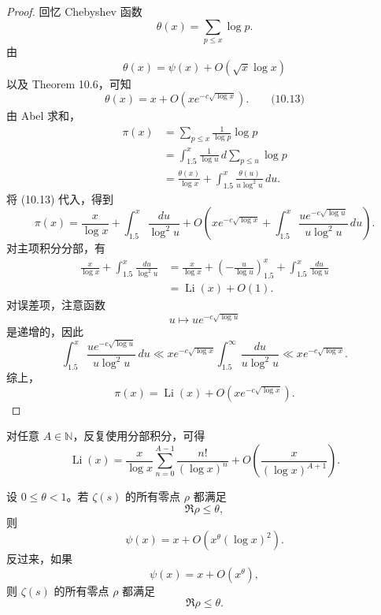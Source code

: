 \begin{proof}
	回忆 Chebyshev 函数
	\[
		\theta(x)=\sum_{p\leq x}\log p.
	\]
	由
	\[
		\theta(x)=\psi(x)+O(\sqrt{x}\log x)
	\]
	以及 Theorem 10.6，可知
	\begin{equation*}
		\theta(x)
		=
		x+O\left(xe^{-c\sqrt{\log x}}\right).
		\qquad\text{(10.13)}
	\end{equation*}
	由 Abel 求和，
	\[
	\begin{aligned}
		\pi(x)
		&=
		\sum_{p\leq x}\frac1{\log p}\log p \\
		&=
		\int_{1.5}^{x}\frac1{\log u}\,d\sum_{p\leq u}\log p \\
		&=
		\frac{\theta(x)}{\log x}
		+
		\int_{1.5}^{x}\frac{\theta(u)}{u\log^2u}\,du.
	\end{aligned}
	\]
	将 (10.13) 代入，得到
	\[
		\pi(x)
		=
		\frac{x}{\log x}
		+
		\int_{1.5}^{x}\frac{du}{\log^2u}
		+
		O\left(
			xe^{-c\sqrt{\log x}}
			+
			\int_{1.5}^{x}\frac{u e^{-c\sqrt{\log u}}}{u\log^2u}\,du
		\right).
	\]
	对主项积分分部，有
	\[
	\begin{aligned}
		\frac{x}{\log x}
		+
		\int_{1.5}^{x}\frac{du}{\log^2u}
		&=
		\frac{x}{\log x}
		+
		\left(-\frac{u}{\log u}\right)_{1.5}^{x}
		+
		\int_{1.5}^{x}\frac{du}{\log u} \\
		&=
		\operatorname{Li}(x)+O(1).
	\end{aligned}
	\]
	对误差项，注意函数
	\[
		u\longmapsto u e^{-c\sqrt{\log u}}
	\]
	是递增的，因此
	\[
		\int_{1.5}^{x}
		\frac{u e^{-c\sqrt{\log u}}}{u\log^2u}\,du
		\ll
		xe^{-c\sqrt{\log x}}
		\int_{1.5}^{\infty}\frac{du}{u\log^2u}
		\ll
		xe^{-c\sqrt{\log x}}.
	\]
	综上，
	\[
		\pi(x)
		=
		\operatorname{Li}(x)
		+
		O\left(xe^{-c\sqrt{\log x}}\right).
	\]
\end{proof}

\begin{remark}[原文 Remark]
	对任意 $A\in\mathbb N$，反复使用分部积分，可得
	\[
		\operatorname{Li}(x)
		=
		\frac{x}{\log x}
		\sum_{n=0}^{A-1}\frac{n!}{(\log x)^n}
		+
		O\left(\frac{x}{(\log x)^{A+1}}\right).
	\]
\end{remark}

\begin{theorem}[原文 Theorem 10.8]
	设 $0\leq\theta<1$。若 $\zeta(s)$ 的所有零点 $\rho$ 都满足
	\[
		\Re\rho\leq\theta,
	\]
	则
	\[
		\psi(x)
		=
		x+O\left(x^\theta(\log x)^2\right).
	\]
	反过来，如果
	\[
		\psi(x)=x+O(x^\theta),
	\]
	则 $\zeta(s)$ 的所有零点 $\rho$ 都满足
	\[
		\Re\rho\leq\theta.
	\]
\end{theorem}

